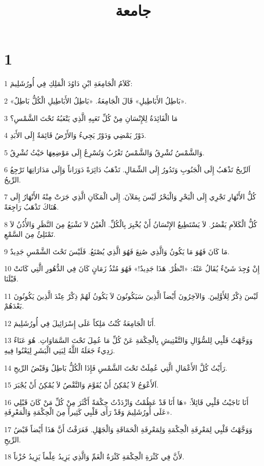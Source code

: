

\title{جامعة}


\chapter{1}

\par 1 كَلاَمُ الْجَامِعَةِ ابْنِ دَاوُدَ الْمَلِكِ فِي أُورُشَلِيمَ:
\par 2 «بَاطِلُ الأَبَاطِيلِ» قَالَ الْجَامِعَةُ. «بَاطِلُ الأَبَاطِيلِ الْكُلُّ بَاطِلٌ».
\par 3 مَا الْفَائِدَةُ لِلإِنْسَانِ مِنْ كُلِّ تَعَبِهِ الَّذِي يَتْعَبُهُ تَحْتَ الشَّمْسِ؟
\par 4 دَوْرٌ يَمْضِي وَدَوْرٌ يَجِيءُ وَالأَرْضُ قَائِمَةٌ إِلَى الأَبَدِ.
\par 5 وَالشَّمْسُ تُشْرِقُ وَالشَّمْسُ تَغْرُبُ وَتُسْرِعُ إِلَى مَوْضِعِهَا حَيْثُ تُشْرِقُ.
\par 6 اَلرِّيحُ تَذْهَبُ إِلَى الْجَنُوبِ وَتَدُورُ إِلَى الشِّمَالِ. تَذْهَبُ دَائِرَةً دَوَرَاناً وَإِلَى مَدَارَاتِهَا تَرْجِعُ الرِّيحُ.
\par 7 كُلُّ الأَنْهَارِ تَجْرِي إِلَى الْبَحْرِ وَالْبَحْرُ لَيْسَ بِمَلآنَ. إِلَى الْمَكَانِ الَّذِي جَرَتْ مِنْهُ الأَنْهَارُ إِلَى هُنَاكَ تَذْهَبُ رَاجِعَةً.
\par 8 كُلُّ الْكَلاَمِ يَقْصُرُ. لاَ يَسْتَطِيعُ الإِنْسَانُ أَنْ يُخْبِرَ بِالْكُلِّ. الْعَيْنُ لاَ تَشْبَعُ مِنَ النَّظَرِ وَالأُذُنُ لاَ تَمْتَلِئُ مِنَ السَّمْعِ.
\par 9 مَا كَانَ فَهُوَ مَا يَكُونُ وَالَّذِي صُنِعَ فَهُوَ الَّذِي يُصْنَعُ. فَلَيْسَ تَحْتَ الشَّمْسِ جَدِيدٌ.
\par 10 إِنْ وُجِدَ شَيْءٌ يُقَالُ عَنْهُ: «انْظُرْ. هَذَا جَدِيدٌ!» فَهُوَ مُنْذُ زَمَانٍ كَانَ فِي الدُّهُورِ الَّتِي كَانَتْ قَبْلَنَا.
\par 11 لَيْسَ ذِكْرٌ لِلأَوَّلِينَ. وَالآخِرُونَ أَيْضاً الَّذِينَ سَيَكُونُونَ لاَ يَكُونُ لَهُمْ ذِكْرٌ عِنْدَ الَّذِينَ يَكُونُونَ بَعْدَهُمْ.
\par 12 أَنَا الْجَامِعَةُ كُنْتُ مَلِكاً عَلَى إِسْرَائِيلَ فِي أُورُشَلِيمَ.
\par 13 وَوَجَّهْتُ قَلْبِي لِلسُّؤَالِ وَالتَّفْتِيشِ بِالْحِكْمَةِ عَنْ كُلِّ مَا عُمِلَ تَحْتَ السَّمَاوَاتِ. هُوَ عَنَاءٌ رَدِيءٌ جَعَلَهُ اللَّهُ لِبَنِي الْبَشَرِ لِيَعْنُوا فِيهِ.
\par 14 رَأَيْتُ كُلَّ الأَعْمَالِ الَّتِي عُمِلَتْ تَحْتَ الشَّمْسِ فَإِذَا الْكُلُّ بَاطِلٌ وَقَبْضُ الرِّيحِ.
\par 15 اَلأَعْوَجُ لاَ يُمْكِنُ أَنْ يُقَوَّمَ وَالنَّقْصُ لاَ يُمْكِنُ أَنْ يُجْبَرَ.
\par 16 أَنَا نَاجَيْتُ قَلْبِي قَائِلاً: «هَا أَنَا قَدْ عَظُمْتُ وَازْدَدْتُ حِكْمَةً أَكْثَرَ مِنْ كُلِّ مَنْ كَانَ قَبْلِي عَلَى أُورُشَلِيمَ وَقَدْ رَأَى قَلْبِي كَثِيراً مِنَ الْحِكْمَةِ وَالْمَعْرِفَةِ».
\par 17 وَوَجَّهْتُ قَلْبِي لِمَعْرِفَةِ الْحِكْمَةِ وَلِمَعْرِفَةِ الْحَمَاقَةِ وَالْجَهْلِ. فَعَرَفْتُ أَنَّ هَذَا أَيْضاً قَبْضُ الرِّيحِ.
\par 18 لأَنَّ فِي كَثْرَةِ الْحِكْمَةِ كَثْرَةُ الْغَمِّ وَالَّذِي يَزِيدُ عِلْماً يَزِيدُ حُزْناً.

